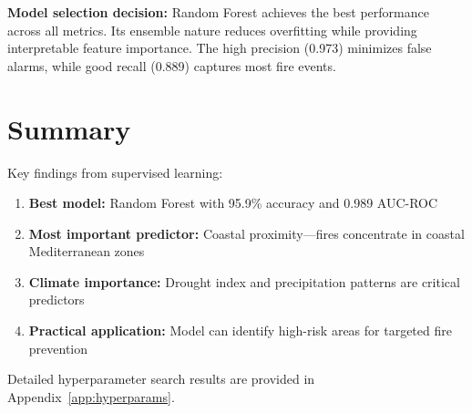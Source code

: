 \textbf{Model selection decision:} Random Forest achieves the best performance across all metrics. Its ensemble nature reduces overfitting while providing interpretable feature importance. The high precision (0.973) minimizes false alarms, while good recall (0.889) captures most fire events.

\section{Summary}
Key findings from supervised learning:
\begin{enumerate}
    \item \textbf{Best model:} Random Forest with 95.9\% accuracy and 0.989 AUC-ROC
    \item \textbf{Most important predictor:} Coastal proximity---fires concentrate in coastal Mediterranean zones
    \item \textbf{Climate importance:} Drought index and precipitation patterns are critical predictors
    \item \textbf{Practical application:} Model can identify high-risk areas for targeted fire prevention
\end{enumerate}

Detailed hyperparameter search results are provided in Appendix~\ref{app:hyperparams}.
